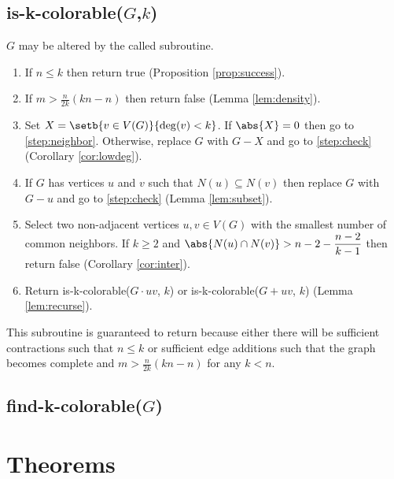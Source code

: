 \subsection{is-k-colorable(\(G\),\(k\))}

\(G\) may be altered by the called subroutine.

\begin{enumerate}
\item \label{step:check} If \(n\le k\) then return true (Proposition \ref{prop:success}).

\item \label{step:density} If \(\displaystyle m>\frac{n}{2k}(kn-n)\) then return false (Lemma \ref{lem:density}).

\item \label{step:small} Set \(X=\setb{v\in V(G)}{\deg(v)<k}\).  If \(\abs{X}=0\) then go to \ref{step:neighbor}.  Otherwise,
  replace \(G\) with \(G-X\) and go to \ref{step:check} (Corollary \ref{cor:lowdeg}).

\item \label{step:neighbor} If \(G\) has vertices \(u\) and \(v\) such that \(N(u)\subseteq N(v)\) then replace \(G\) with
  \(G-u\) and go to \ref{step:check} (Lemma \ref{lem:subset}).

\item \label{step:common} Select two non-adjacent vertices \(u,v\in V(G)\) with the smallest number of common neighbors.  If
  \(k\ge2\) and \(\displaystyle\abs{N(u)\cap N(v)}>n-2-\frac{n-2}{k-1}\) then return false (Corollary \ref{cor:inter}).

\item Return is-k-colorable(\(G\cdot uv\), \(k\)) or is-k-colorable(\(G+uv\), \(k\)) (Lemma \ref{lem:recurse}).

\end{enumerate}

This subroutine is guaranteed to return because either there will be sufficient contractions such that \(n\le k\) or
sufficient edge additions such that the graph becomes complete and \(m>\frac{n}{2k}(kn-n)\) for any \(k<n\).

\subsection{find-k-colorable(\(G\))}


\section{Theorems}

